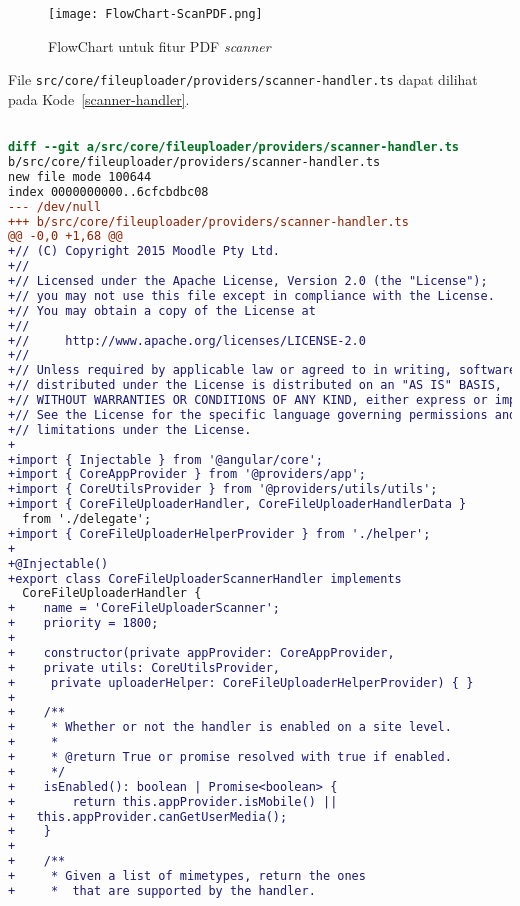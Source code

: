 \begin{figure}[H] 
	\centering  
	\texttt{[image: FlowChart-ScanPDF.png]}  
	\caption[FlowChart untuk fitur PDF \textit{scanner}] {FlowChart untuk fitur PDF \textit{scanner}} 
	\label{fig:scan:flowchart} 
\end{figure} 

File \texttt{src/core/fileuploader/providers/scanner-handler.ts} dapat dilihat pada \mbox{Kode \ref{scanner-handler}}. 

\begin{lstlisting}[language=diff, frame=single, label ={scanner-handler}, caption = File \texttt{scanner-handler.ts} ]

diff --git a/src/core/fileuploader/providers/scanner-handler.ts 
b/src/core/fileuploader/providers/scanner-handler.ts
new file mode 100644
index 0000000000..6cfcbdbc08
--- /dev/null
+++ b/src/core/fileuploader/providers/scanner-handler.ts
@@ -0,0 +1,68 @@
+// (C) Copyright 2015 Moodle Pty Ltd.
+//
+// Licensed under the Apache License, Version 2.0 (the "License");
+// you may not use this file except in compliance with the License.
+// You may obtain a copy of the License at
+//
+//     http://www.apache.org/licenses/LICENSE-2.0
+//
+// Unless required by applicable law or agreed to in writing, software
+// distributed under the License is distributed on an "AS IS" BASIS,
+// WITHOUT WARRANTIES OR CONDITIONS OF ANY KIND, either express or implied.
+// See the License for the specific language governing permissions and
+// limitations under the License.
+
+import { Injectable } from '@angular/core';
+import { CoreAppProvider } from '@providers/app';
+import { CoreUtilsProvider } from '@providers/utils/utils';
+import { CoreFileUploaderHandler, CoreFileUploaderHandlerData } 
  from './delegate';
+import { CoreFileUploaderHelperProvider } from './helper';
+
+@Injectable()
+export class CoreFileUploaderScannerHandler implements 
  CoreFileUploaderHandler {
+    name = 'CoreFileUploaderScanner';
+    priority = 1800;
+
+    constructor(private appProvider: CoreAppProvider, 
+    private utils: CoreUtilsProvider,
+     private uploaderHelper: CoreFileUploaderHelperProvider) { }
+
+    /**
+     * Whether or not the handler is enabled on a site level.
+     *
+     * @return True or promise resolved with true if enabled.
+     */
+    isEnabled(): boolean | Promise<boolean> {
+        return this.appProvider.isMobile() || 
+	this.appProvider.canGetUserMedia();
+    }
+
+    /**
+     * Given a list of mimetypes, return the ones
+     *  that are supported by the handler.

\end{lstlisting}
